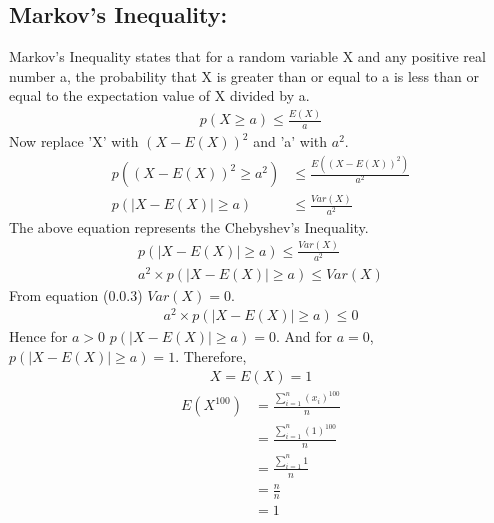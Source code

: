 \documentclass[journal,12pt,twocolumn]{IEEEtran}
\begin{document}
\subsection*{Markov's Inequality:}
Markov's Inequality states that for a random variable X and any positive real number a, the probability that X is greater than or equal to a is less than or equal to the expectation value of X divided by a.
\begin{align}
    p(X\geq a) {\leq}\frac{E(X)}{a}
\end{align}
Now replace 'X' with ${(X-E(X))}^2$ and 'a' with $a^2$.
\begin{align}
    p({(X-E(X))^2{\geq}a^2}) &{\leq}\frac{E((X-E(X))^2)}{a^2}\\
    p(|{X-E(X)}|{\geq}a)&{\leq}\frac{Var(X)}{a^2}
\end{align}
The above equation represents the Chebyshev's Inequality.
\begin{align}
    p(|X-E(X)|{\geq}a){\leq}\frac{Var(X)}{a^2}\\
    a^2{\times}p(|X-E(X)|{\geq}a){\leq}Var(X)
\end{align}
From equation (0.0.3) $Var(X)=0$.
\begin{align}
    a^2{\times}p(|X-E(X)|{\geq}a){\leq}0
\end{align}
Hence for $a>0$ $p(|X-E(X)|{\geq}a)=0$. And for $a=0$, $p(|X-E(X)|{\geq}a)=1$. Therefore,
\begin{align}
    X=E(X)=1
\end{align}
\begin{align}
    E(X^{100})&=\frac{\sum_{i=1}^{n}{(x_i)^{100}}}{n}\\
      &=\frac{\sum_{i=1}^{n}{(1)^{100}}}{n}\\
      &=\frac{\sum_{i=1}^{n}{1}}{n}\\
      &=\frac{n}{n}\\
      &=1
\end{align}
\centering
{}
\end{document}
